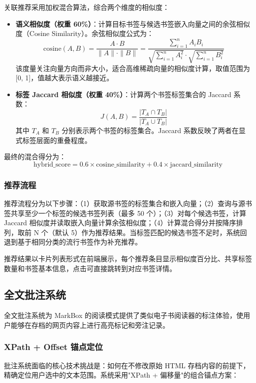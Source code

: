 \documentclass[12pt,a4paper]{ctexart}
\begin{document}
关联推荐采用加权混合算法，综合两个维度的相似度：

\begin{itemize}
  \item \textbf{语义相似度（权重 60\%）}：计算目标书签与候选书签嵌入向量之间的余弦相似度（Cosine Similarity）。余弦相似度公式为：
  \[
  \text{cosine}(A, B) = \frac{A \cdot B}{\|A\| \cdot \|B\|} = \frac{\sum_{i=1}^{n} A_i B_i}{\sqrt{\sum_{i=1}^{n} A_i^2} \cdot \sqrt{\sum_{i=1}^{n} B_i^2}}
  \]
  该度量关注向量方向而非大小，适合高维稀疏向量的相似度计算，取值范围为 [0, 1]，值越大表示语义越接近。

  \item \textbf{标签 Jaccard 相似度（权重 40\%）}：计算两个书签标签集合的 Jaccard 系数：
  \[
  J(A, B) = \frac{|T_A \cap T_B|}{|T_A \cup T_B|}
  \]
  其中 \(T_A\) 和 \(T_B\) 分别表示两个书签的标签集合。Jaccard 系数反映了两者在显式标签层面的重叠程度。
\end{itemize}

最终的混合得分为：
\[
\text{hybrid\_score} = 0.6 \times \text{cosine\_similarity} + 0.4 \times \text{jaccard\_similarity}
\]

\subsubsection{推荐流程}

推荐流程分为以下步骤：（1）获取源书签的标签集合和嵌入向量；（2）查询与源书签共享至少一个标签的候选书签列表（最多 50 个）；（3）对每个候选书签，计算 Jaccard 相似度并读取嵌入向量计算余弦相似度；（4）计算混合得分并按降序排列，取前 N 个（默认 5）作为推荐结果。当标签匹配的候选书签不足时，系统回退到基于相同分类的流行书签作为补充推荐。

推荐结果以卡片列表形式在前端展示，每个推荐条目显示相似度百分比、共享标签数量和书签基本信息，点击可直接跳转到对应书签详情。

\subsection{全文批注系统}

全文批注系统为 MarkBox 的阅读模式提供了类似电子书阅读器的标注体验，使用户能够在存档的网页内容上进行高亮标记和旁注记录。

\subsubsection{XPath + Offset 锚点定位}

批注系统面临的核心技术挑战是：如何在不修改原始 HTML 存档内容的前提下，精确定位用户选中的文本范围。系统采用"XPath + 偏移量"的组合锚点方案：
\end{document}

